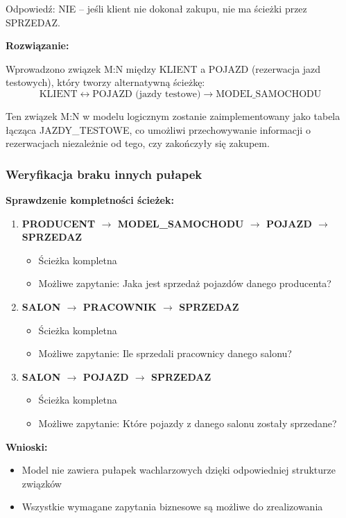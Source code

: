 \documentclass[a4paper,titleauthor]{mwart}
\begin{document}
	Odpowiedź: NIE -- jeśli klient nie dokonał zakupu, nie ma ścieżki przez SPRZEDAZ.
	
	\textbf{Rozwiązanie:}

	Wprowadzono związek M:N między KLIENT a POJAZD (rezerwacja jazd testowych), 
	który tworzy alternatywną ścieżkę:
	$$\text{KLIENT} \leftrightarrow \text{POJAZD (jazdy testowe)} \rightarrow \text{MODEL\_SAMOCHODU}$$

	Ten związek M:N w modelu logicznym zostanie zaimplementowany jako tabela 
	łącząca JAZDY\_TESTOWE, co umożliwi przechowywanie informacji o 
	rezerwacjach niezależnie od tego, czy zakończyły się zakupem.
	
	\subsubsection{Weryfikacja braku innych pułapek}
	
	\textbf{Sprawdzenie kompletności ścieżek:}
	
	\begin{enumerate}
		\item \textbf{PRODUCENT $\rightarrow$ MODEL\_SAMOCHODU $\rightarrow$ POJAZD $\rightarrow$ SPRZEDAZ}
		\begin{itemize}
			\item Ścieżka kompletna
			\item Możliwe zapytanie: Jaka jest sprzedaż pojazdów danego producenta?
		\end{itemize}
		
		\item \textbf{SALON $\rightarrow$ PRACOWNIK $\rightarrow$ SPRZEDAZ}
		\begin{itemize}
			\item Ścieżka kompletna
			\item Możliwe zapytanie: Ile sprzedali pracownicy danego salonu?
		\end{itemize}
		
		\item \textbf{SALON $\rightarrow$ POJAZD $\rightarrow$ SPRZEDAZ}
		\begin{itemize}
			\item Ścieżka kompletna
			\item Możliwe zapytanie: Które pojazdy z danego salonu zostały sprzedane?
		\end{itemize}
	\end{enumerate}
	
	\textbf{Wnioski:}
	\begin{itemize}
		\item Model nie zawiera pułapek wachlarzowych dzięki odpowiedniej strukturze związków
		\item Wszystkie wymagane zapytania biznesowe są możliwe do zrealizowania
	\end{itemize}
	
\end{document}
